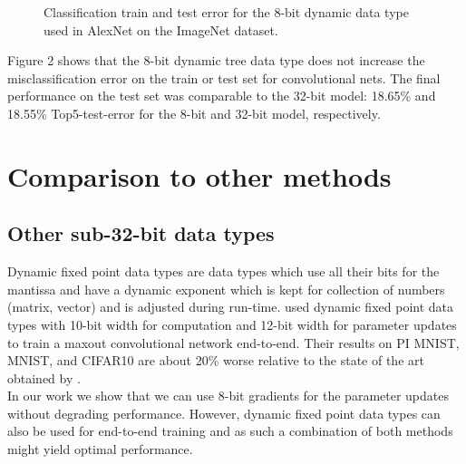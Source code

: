 \documentclass{article} %
\begin{document}
\begin{figure}[h]
	\begin{center}
	\end{center}
	\caption{Classification train and test error for the 8-bit dynamic data type used in AlexNet on the ImageNet dataset.}
\end{figure}

Figure 2 shows that the 8-bit dynamic tree data type does not increase the misclassification error on the train or test set for convolutional nets. The final performance on the test set was comparable to the 32-bit model: 18.65\% and 18.55\% Top5-test-error for the 8-bit and 32-bit model, respectively.

\section{Comparison to other methods}

\subsection{Other sub-32-bit data types}

Dynamic fixed point data types are data types which use all their bits for the mantissa and have a dynamic exponent which is kept for collection of numbers (matrix, vector) and is adjusted during run-time. \citet{courbariaux2014low} used dynamic fixed point data types with 10-bit width for computation and 12-bit width for parameter updates to train a maxout convolutional network end-to-end. Their results on PI MNIST, MNIST, and CIFAR10 are about 20\% worse relative to the state of the art obtained by \citet{goodfellow2013maxout}.\\ 
In our work we show that we can use 8-bit gradients for the parameter updates without degrading performance. However, dynamic fixed point data types can also be used for end-to-end training and as such a combination of both methods might yield optimal performance. 
\end{document}
